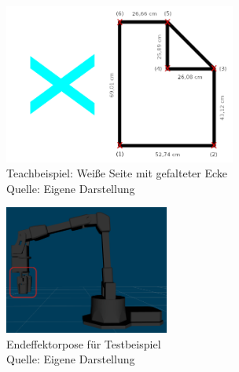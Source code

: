 \begin{figure}[htb]
	\centering
	\includegraphics[width=0.68\textwidth]{images/loesungsweg/white_page_with_folded_corner}
	\caption[Teachbeispiel: Weiße Seite mit gefalteter Ecke]{Teachbeispiel: Weiße Seite mit gefalteter Ecke\\Quelle: Eigene Darstellung}
	\label{fig:white_page_with_folded_corner}
\end{figure}
\FloatBarrier

\begin{figure}[htb]
	\centering
	\includegraphics[width=0.48\textwidth]{images/loesungsweg/endeffektor_pose_2}
	\caption[Endeffektorpose für Testbeispiel]{Endeffektorpose für Testbeispiel\\Quelle: Eigene Darstellung}
	\label{fig:endeffektor_pose}
\end{figure}
\FloatBarrier


